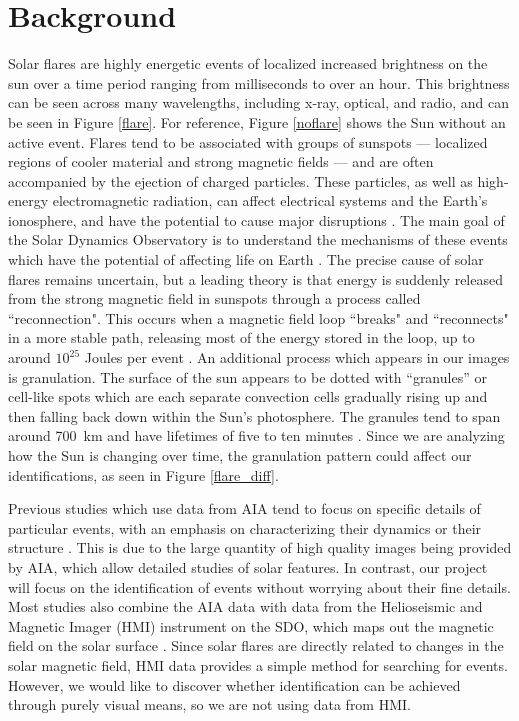 \documentclass[12pt, letterpaper]{article}
\begin{document}
\section*{Background}

Solar flares are highly energetic events of localized increased brightness on the sun over a time period ranging from milliseconds to over an hour. This brightness can be seen across many wavelengths, including x-ray, optical, and radio, and can be seen in Figure \ref{flare}. For reference, Figure \ref{noflare} shows the Sun without an active event. Flares tend to be associated with groups of sunspots — localized regions of cooler material and strong magnetic fields — and are often accompanied by the ejection of charged particles. These particles, as well as high-energy electromagnetic radiation, can affect electrical systems and the Earth’s ionosphere, and have the potential to cause major disruptions \cite{BOB}. The main goal of the Solar Dynamics Observatory is to understand the mechanisms of these events which have the potential of affecting life on Earth \cite{Pesnell2012}. The precise cause of solar flares remains uncertain, but a leading theory is that energy is suddenly released from the strong magnetic field in sunspots through a process called ``reconnection". This occurs when a magnetic field loop ``breaks" and ``reconnects" in a more stable path, releasing most of the energy stored in the loop, up to around $10^25$ Joules per event \cite{BOB}. An additional process which appears in our images is granulation. The surface of the sun appears to be dotted with “granules” or cell-like spots which are each separate convection cells gradually rising up and then falling back down within the Sun’s photosphere. The granules tend to span around 700~km and have lifetimes of five to ten minutes \cite{BOB}. Since we are analyzing how the Sun is changing over time, the granulation pattern could affect our identifications, as seen in Figure \ref{flare_diff}.

Previous studies which use data from AIA tend to focus on specific details of particular events, with an emphasis on characterizing their dynamics \cite{Dai2021}\cite{Chitta2018} or their structure \cite{Aschwanden2017}. This is due to the large quantity of high quality images being provided by AIA, which allow detailed studies of solar features. In contrast, our project will focus on the identification of events without worrying about their fine details. Most studies also combine the AIA data with data from the Helioseismic and Magnetic Imager (HMI) instrument on the SDO, which maps out the magnetic field on the solar surface \cite{Dai2021}\cite{Chitta2018}. Since solar flares are directly related to changes in the solar magnetic field, HMI data provides a simple method for searching for events. However, we would like to discover whether identification can be achieved through purely visual means, so we are not using data from HMI.
\end{document}
